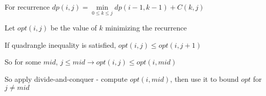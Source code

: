 For recurrence $dp(i, j) = \underset{0 \leq k \leq j}{\min} dp(i - 1, k - 1) + C(k, j)$

Let $opt(i, j)$ be the value of $k$ minimizing the recurrence

If quadrangle inequality is satisfied, $opt(i, j) \leq opt(i, j + 1)$

So for some $mid$, $j \leq mid \to opt(i, j) \leq opt(i, mid)$

So apply divide-and-conquer - compute $opt(i, mid)$, then use it to bound $opt$ for $j \neq mid$